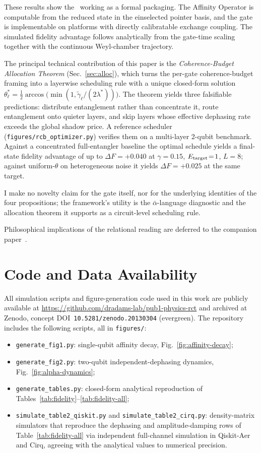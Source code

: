 These results show the \RCF~working as a formal packaging. The Affinity Operator is computable from the reduced state in the einselected pointer basis, and the gate is implementable on platforms with directly calibratable exchange coupling. The simulated fidelity advantage follows analytically from the gate-time scaling together with the continuous Weyl-chamber trajectory.

The principal technical contribution of this paper is the
\emph{Coherence-Budget Allocation Theorem} (Sec.~\ref{sec:alloc}), which
turns the per-gate coherence-budget framing into a layerwise scheduling
rule with a unique closed-form solution
$\theta_\ell^\ast = \tfrac{1}{2}\arccos\bigl(\min(1,\tilde\gamma_\ell/(2\lambda^\ast))\bigr)$.
The theorem yields three falsifiable predictions: distribute entanglement rather than concentrate it, route entanglement onto quieter layers, and skip layers whose effective dephasing rate exceeds the global shadow price. A reference scheduler (\texttt{figures/\allowbreak rcb\_\allowbreak optimizer.py}) verifies them on a multi-layer 2-qubit benchmark.
Against a concentrated full-entangler baseline the optimal schedule
yields a final-state fidelity advantage of up to $\Delta F = +0.040$ at
$\gamma = 0.15$, $E_{\rm target}\!=\!1$, $L\!=\!8$; against
uniform-$\theta$ on heterogeneous noise it yields $\Delta F = +0.025$
at the same target.

I make no novelty claim for the gate itself, nor for the underlying
identities of the four propositions; the framework's utility is the
$\bar\alpha$-language diagnostic and the allocation theorem it
supports as a circuit-level scheduling rule.

Philosophical implications of the relational reading are deferred to
the companion paper~\cite{Adams2026Philosophy}.

\section*{Code and Data Availability}

All simulation scripts and figure-generation code used in this work are
publicly available at
\url{https://github.com/dradams-lab/pub1-physics-rct} and archived
at Zenodo, concept DOI~\texttt{10.5281/\allowbreak zenodo.20130304} (evergreen).
The repository includes the following scripts, all in \texttt{figures/}:
\begin{itemize}
  \item \texttt{generate\_fig1.py}: single-qubit affinity decay,
    Fig.~\ref{fig:affinity-decay};
  \item \texttt{generate\_fig2.py}: two-qubit independent-dephasing
    dynamics, Fig.~\ref{fig:alpha-dynamics};
  \item \texttt{generate\_tables.py}: closed-form analytical
    reproduction of Tables~\ref{tab:fidelity}--\ref{tab:fidelity-all};
  \item \texttt{simulate\_table2\_qiskit.py} and
    \texttt{simulate\_table2\_cirq.py}: density-matrix simulators that
    reproduce the dephasing and amplitude-damping rows of
    Table~\ref{tab:fidelity-all} via independent full-channel simulation
    in Qiskit-Aer and Cirq, agreeing with the analytical values to
    numerical precision.
\end{itemize}
